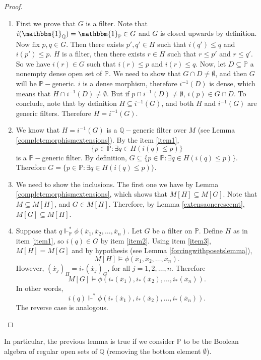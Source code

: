 \documentclass[10pt,longbibliography]{article}
\newcommand{\One}{\mathbbm{1}}
\newcommand{\Po}{\mathbb{P}}
\newcommand{\Qo}{\mathbb{Q}}
\newcommand{\xdot}{\overset{.}{x}}
\newcommand{\forces}{\Vdash^{*}}
\begin{document}
\begin{proof}
	\begin{enumerate}
		\item First we prove that $G$ is a filter. Note that $i(\One_{\Qo}) = \One_{\Po} \in G$ and $G$ is closed upwards by definition. Now fix $p,q \in G$. Then there exists $p',q' \in H$ such that $i(q') \leq q$ and $i(p') \leq p$. $H$ is a filter, then there exists $r \in H$ such that $r \leq p'$ and $r \leq q'$. So we have $i(r) \in G$ such that $i(r) \leq p$ and $i(r) \leq q$. Now, let $D \subseteq \Po$ a nonempty dense open set of $\Po$. We need to show that $G \cap D \neq \emptyset$, and then $G$ will be $\Po-$generic. $i$ is a dense morphism, therefore $i^{-1}(D)$ is dense, which means that $H \cap i^{-1}(D) \neq \emptyset$. But if $p\cap i^{-1}(D) \neq \emptyset$, $i(p) \in G \cap D$. To conclude, note that by definition $H \subseteq i^{-1}(G)$, and both $H$ and $i^{-1}(G)$ are generic filters. Therefore $H  = i^{-1}(G)$.
		
		\item We know that $H = i^{-1}(G)$ is a $\Qo-$generic filter over $M$ (see Lemma \ref{completemorphismextensions}). By the item \ref{item1},  $$\{p \in \Po: \exists q \in H(i(q) \leq p)\}$$ is a $\Po-$generic filter. By definition, $G \subseteq \{p \in \Po: \exists q \in H(i(q) \leq p)\}$. Therefore $G = \{p \in \Po: \exists q \in H(i(q) \leq p)\}$.
		
		\item We need to show the inclusions. The first one we have by Lemma \ref{completemorphismextensions}, which shows that $M[H] \subseteq M[G]$. Note that $M \subseteq M[H]$, and $G \in M[H]$. Therefore, by { Lemma \ref{extensaoncrescemt}}, $M[G] \subseteq M[H]$.
		
		\item Suppose that $q \forces_{\Po} \phi(\xdot_{1},\xdot_{2},\dots,\xdot_{n}).$ Let $G$ be a filter on $\Po$. Define $H$ as in item \ref{item1}, so $i(q) \in G$ by item \ref{item2}. Using item \ref{item3}, $M[H] = M[G]$ and by hypothesis { (see Lemma \ref{forcingwithposetslemma})}, $$M[H] \models \phi(\xdot_{1},\xdot_{2}, \dots, \xdot_{n}).$$ However, $(\xdot_{j})_{H} = i_{*}(\xdot_{j})_{G}$, for all $j =1,2, \dots, n$. Therefore
		$$M[G] \models \phi(i_{*}(\xdot_{1}),i_{*}(\xdot_{2}),\dots,i_{*}(\xdot_{n})).$$
		In other words, $$i(q) \forces \phi(i_{*}(\xdot_{1}),i_{*}(\xdot_{2}),\dots, i_{*}(\xdot_{n})).$$ The reverse case is analogous. 
	\end{enumerate}
	
\end{proof}
In particular, the previous lemma is true if we consider $\Po$ to be the Boolean algebra of regular open sets of $\Qo$ (removing the bottom element $\emptyset$).
\end{document}
